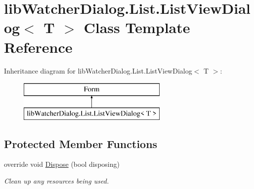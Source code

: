 \hypertarget{classlib_watcher_dialog_1_1_list_1_1_list_view_dialog_3_01_t_01_4}{\section{lib\+Watcher\+Dialog.\+List.\+List\+View\+Dialog$<$ T $>$ Class Template Reference}
\label{classlib_watcher_dialog_1_1_list_1_1_list_view_dialog_3_01_t_01_4}
}
Inheritance diagram for lib\+Watcher\+Dialog.\+List.\+List\+View\+Dialog$<$ T $>$\+:\begin{figure}[H]
\begin{center}
\leavevmode
\includegraphics[height=2.000000cm]{classlib_watcher_dialog_1_1_list_1_1_list_view_dialog_3_01_t_01_4}
\end{center}
\end{figure}
\subsection*{Protected Member Functions}
\begin{DoxyCompactItemize}
\item 
override void \hyperlink{classlib_watcher_dialog_1_1_list_1_1_list_view_dialog_3_01_t_01_4_aa364bdfeca251bfe211a90c06f992fb4}{Dispose} (bool disposing)
\begin{DoxyCompactList}\small\item\em Clean up any resources being used. \end{DoxyCompactList}\end{DoxyCompactItemize}

